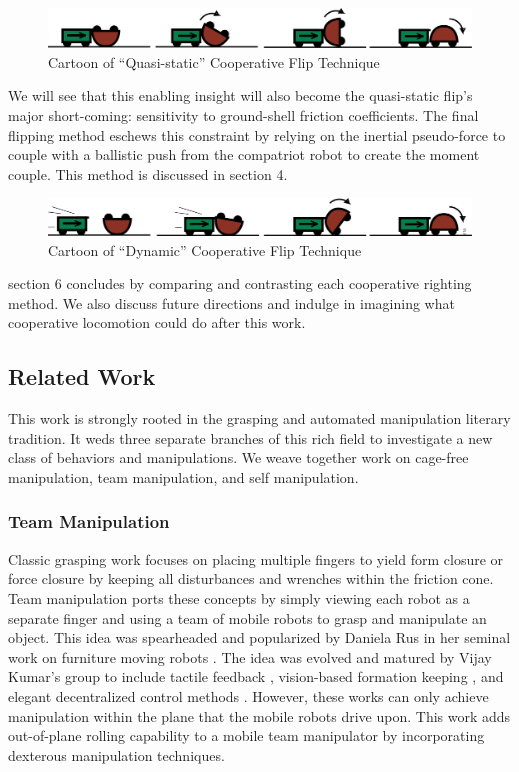 \documentclass[letterpaper, 10 pt, conference]{ieeeconf}
\begin{document}
\begin{figure}[ht]
\centering
\includegraphics[width=1.0\columnwidth]{QuasiStatic_CoopCartoon.png}
\caption{Cartoon of ``Quasi-static'' Cooperative Flip Technique}
\end{figure}

We will see that this enabling insight will also become the quasi-static flip's major short-coming: sensitivity to ground-shell friction coefficients.
The final flipping method eschews this constraint by relying on the inertial pseudo-force to couple with a ballistic push from the compatriot robot to create the moment couple.
This method is discussed in section 4.

\begin{figure}[ht]
\centering
\includegraphics[width=1.0\columnwidth]{Dynamic_CoopCartoon.png}
\caption{Cartoon of ``Dynamic'' Cooperative Flip Technique}
\end{figure}

section 6 concludes by comparing and contrasting each cooperative righting method.
We also discuss future directions and indulge in imagining what cooperative locomotion could do after this work.

\subsection{Related Work}

This work is strongly rooted in the grasping and automated manipulation literary tradition.
It weds three separate branches of this rich field to investigate a new class of behaviors and manipulations.
We weave together work on cage-free manipulation, team manipulation, and self manipulation.

\subsubsection{Team Manipulation}
Classic grasping work focuses on placing multiple fingers to yield form closure or force closure by keeping all disturbances and wrenches within the friction cone.
Team manipulation ports these concepts by simply viewing each robot as a separate finger and using a team of mobile robots to grasp and manipulate an object.
This idea was spearheaded and popularized by Daniela Rus in her seminal work on furniture moving robots \cite{rus1995moving}.
The idea was evolved and matured by Vijay Kumar's group to include tactile feedback \cite{sugar2002control}, vision-based formation keeping \cite{spletzer2001cooperative}, and elegant decentralized control methods \cite{song2002potential}.
However, these works can only achieve manipulation within the plane that the mobile robots drive upon.
This work adds out-of-plane rolling capability to a mobile team manipulator by incorporating dexterous manipulation techniques.
\end{document}

